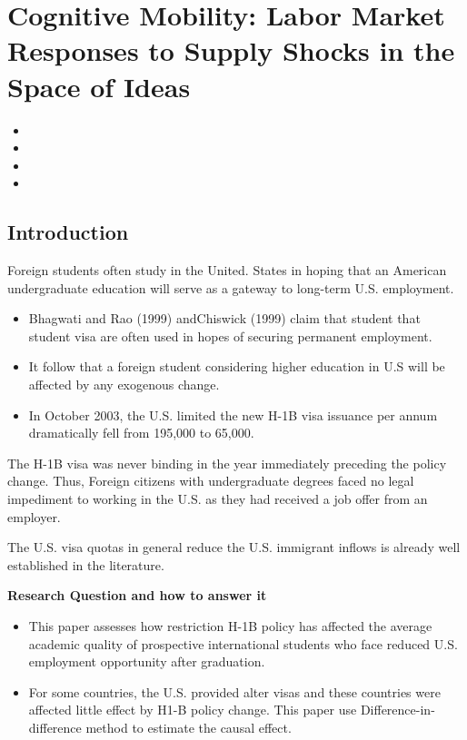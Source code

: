\documentclass[../root]{subfiles}
\begin{document}
    \chapter{Cognitive Mobility: Labor Market Responses to Supply Shocks in the Space of Ideas}

    \begin{shortsummary}
        \begin{itemize}
            \item {} 
            \item {}
            \item {}
            \item {}
        \end{itemize}
    \end{shortsummary}

    \section{Introduction}
   Foreign students often study in the United. States in hoping that an American undergraduate education will serve as a gateway to long-term U.S. employment.
   
   \begin{itemize}
       \item  Bhagwati and Rao (1999) andChiswick (1999) claim that student that student visa are often used in hopes of securing permanent employment.
       \item It follow that a foreign student considering higher education in U.S will be affected by any exogenous change.
       \item In October 2003, the U.S. limited the new H-1B visa issuance per annum dramatically fell from 195,000 to 65,000. 
   \end{itemize}
   The H-1B visa was never binding in the year immediately preceding the policy change.
   Thus, Foreign citizens with undergraduate degrees faced no legal impediment to working in the U.S. as they had received a job offer from an employer. 
   
   The U.S. visa quotas in general reduce the U.S. immigrant inflows is already well established in the literature.
   
   {\bf Research Question and how to answer it}
   \begin{itemize}
       \item  This paper assesses how restriction H-1B policy has affected the average academic quality of prospective international students who face reduced U.S. employment opportunity after graduation. 
       \item For some countries, the U.S. provided alter visas and these countries were affected little effect by H1-B policy change. This paper use Difference-in-difference method to estimate the causal effect.
   \end{itemize}
  
\end{document}
